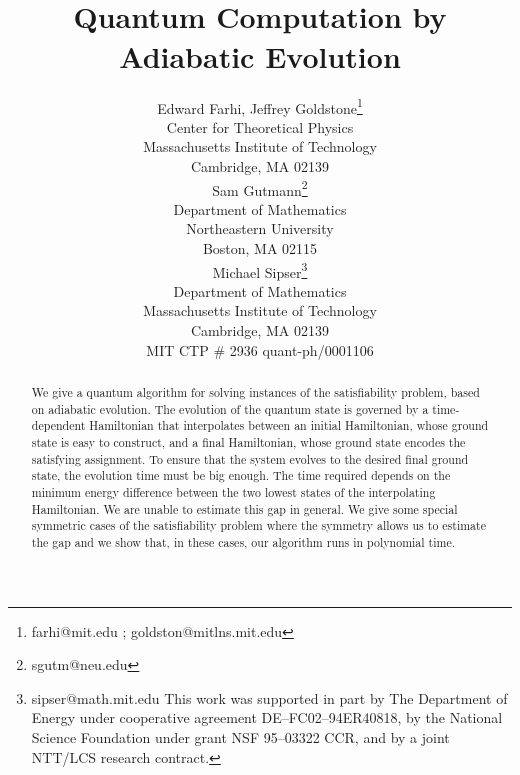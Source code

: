 \documentclass[twoside]{article}
\numberwithin{equation}{section}
\begin{document}
\title{\mbox{}\vspace{-1.3in}\mbox{}\\Quantum Computation by
Adiabatic Evolution}

\author{Edward Farhi, Jeffrey Goldstone\thanks{farhi@mit.edu ;   
goldston@mitlns.mit.edu}\\[-0.5ex] \small
 Center for Theoretical Physics\\[-0.7ex] \small 
 Massachusetts Institute of Technology\\[-0.7ex] \small 
 Cambridge, MA  02139\\[1.5ex] Sam
Gutmann\thanks{sgutm@neu.edu}\\[-0.5ex] \small
 Department of Mathematics\\[-0.7ex] \small
  Northeastern University\\[-0.7ex] \small 
 Boston, MA 02115\\[1.5ex] Michael Sipser\thanks{sipser@math.mit.edu
\protect\newline This work was supported in part by The Department of
Energy under cooperative agreement  DE--FC02--94ER40818, by
the National Science Foundation under grant NSF 95--03322 CCR, and by a
joint NTT/LCS  research contract.}\\[-0.5ex]\small
 Department of Mathematics\\[-0.7ex] \small 
 Massachusetts Institute of Technology\\[-0.7ex] \small
 Cambridge, MA  02139\\[2ex]\small MIT CTP \# 2936\qquad
  quant-ph/0001106}

\date{}
\maketitle
\thispagestyle{empty}

\begin{abstract}\noindent  We give a quantum algorithm for solving
instances of the satisfiability problem, based on adiabatic evolution.  The
evolution of the quantum state is governed by a time-dependent
Hamiltonian that interpolates between an initial Hamiltonian, whose
ground state is easy to construct, and a final Hamiltonian, whose ground
state  encodes the satisfying assignment.  To ensure that the system
evolves to the desired final ground state, the evolution time must be big
enough.  The time required depends on the minimum energy difference
between the two lowest states of the interpolating Hamiltonian.  We are
unable to estimate this gap in general.  We give some special symmetric
cases of the satisfiability problem where the symmetry allows us to
estimate the gap and we show that, in these cases, our algorithm runs in
polynomial time.
\end{abstract}
\end{document}
